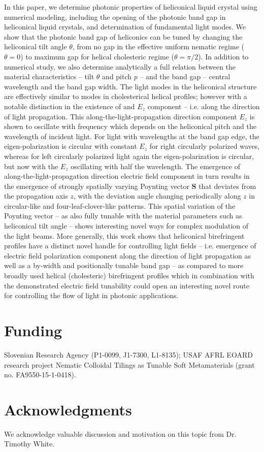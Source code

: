 \documentclass{osa-article}
\renewcommand{\vec}[1]{\mathbf{#1}}
\begin{document}
In this paper, we determine photonic properties of heliconical liquid crystal using numerical modeling, including the opening of the photonic band gap in heliconical liquid crystals,
and determination of fundamental light modes.
We show that the photonic band gap of heliconics can be tuned by changing the heliconical tilt angle $\theta$, 
from no gap in the effective uniform nematic regime ($\theta=0$) to maximum gap for helical cholesteric regime ($\theta = \pi/2$). 
In addition to numerical study, we also determine analytically a full relation between the material characteristics -- tilt $\theta$ and pitch $p$ -- 
and the band gap -- central wavelength and the band gap width.
The light modes in the heliconical structure are effectively similar to modes in cholesterical helical profiles; 
however with a notable distinction in the existence of and $E_z$ component -- i.e. along the direction of light propagation. 
This along-the-light-propagation direction component $E_z$ is shown to oscillate with frequency which depends on the heliconical pitch and the wavelength of incident light. 
For light with wavelengths at the band gap edge, the eigen-polarization is circular with constant $E_z$ for right circularly polarized waves,
whereas for left circularly polarized light again the eigen-polarization is circular, but now with the $E_z$ oscillating with half the wavelength.
The emergence of along-the-light-propagation direction electric field component in turn results in the emergence of strongly spatially varying Poynting vector $\vec{S}$ 
that deviates from the propagation axis $z$, with the deviation angle changing periodically along $z$ in circular-like and four-leaf-clover-like patterns.
This spatial variation of the Poynting vector -- as also fully tunable with the material parameters such as heliconical tilt angle -- 
shows interesting novel ways for complex modulation of the light beams. 
More generally, this work shows that heliconical birefringent profiles have a distinct novel handle for controlling light fields 
-- i.e. emergence of electric field polarization component along the direction of light propagation as well as a by-width and positionally tunable band gap -- 
as compared to more broadly used helical (cholesteric) birefringent profiles which in combination with the demonstrated electric field tunability 
could open an interesting novel route for controlling the flow of light in photonic applications.  

\section*{Funding}
Slovenian Research Agency (P1-0099, J1-7300, L1-8135); USAF AFRL EOARD research project Nematic Colloidal Tilings as Tunable Soft Metamaterials (grant no. FA9550-15-1-0418).\\

\section*{Acknowledgments}
We acknowledge valuable discussion and motivation on this topic from Dr. Timothy White. 





\end{document}

